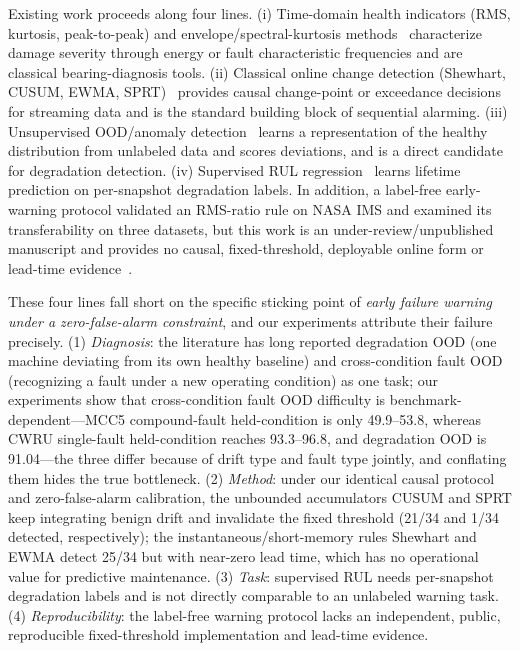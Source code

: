 \documentclass[journal]{IEEEtran}
\begin{document}
Existing work proceeds along four lines. (i) Time-domain health indicators (RMS, kurtosis, peak-to-peak) and envelope/spectral-kurtosis methods~\cite{dyer1978,antoni2006,randall2011} characterize damage severity through energy or fault characteristic frequencies and are classical bearing-diagnosis tools. (ii) Classical online change detection (Shewhart, CUSUM, EWMA, SPRT)~\cite{shewhart1931,page1954,roberts1959,wald1945} provides causal change-point or exceedance decisions for streaming data and is the standard building block of sequential alarming. (iii) Unsupervised OOD/anomaly detection~\cite{ruff2018,hendrycks2017} learns a representation of the healthy distribution from unlabeled data and scores deviations, and is a direct candidate for degradation detection. (iv) Supervised RUL regression~\cite{wang2020} learns lifetime prediction on per-snapshot degradation labels. In addition, a label-free early-warning protocol validated an RMS-ratio rule on NASA IMS and examined its transferability on three datasets, but this work is an under-review/unpublished manuscript and provides no causal, fixed-threshold, deployable online form or lead-time evidence~\cite{hora_submitted,hora_unpublished}.

These four lines fall short on the specific sticking point of \emph{early failure warning under a zero-false-alarm constraint}, and our experiments attribute their failure precisely. (1) \emph{Diagnosis}: the literature has long reported degradation OOD (one machine deviating from its own healthy baseline) and cross-condition fault OOD (recognizing a fault under a new operating condition) as one task; our experiments show that cross-condition fault OOD difficulty is benchmark-dependent---MCC5 compound-fault held-condition is only 49.9--53.8, whereas CWRU single-fault held-condition reaches 93.3--96.8, and degradation OOD is 91.04---the three differ because of drift type and fault type jointly, and conflating them hides the true bottleneck. (2) \emph{Method}: under our identical causal protocol and zero-false-alarm calibration, the unbounded accumulators CUSUM and SPRT keep integrating benign drift and invalidate the fixed threshold (21/34 and 1/34 detected, respectively); the instantaneous/short-memory rules Shewhart and EWMA detect 25/34 but with near-zero lead time, which has no operational value for predictive maintenance. (3) \emph{Task}: supervised RUL needs per-snapshot degradation labels and is not directly comparable to an unlabeled warning task. (4) \emph{Reproducibility}: the label-free warning protocol lacks an independent, public, reproducible fixed-threshold implementation and lead-time evidence.
\end{document}
